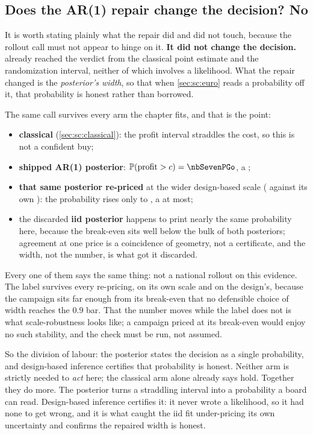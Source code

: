 \subsection*{Does the AR(1) repair change the decision? No}

It is worth stating plainly what the repair did and did not touch, because the rollout call must not
appear to hinge on it. \textbf{It did not change the decision.}  already
reached the verdict from the classical point estimate and the randomization interval, neither of which
involves a likelihood. What the repair changed is the \emph{posterior's width}, so that when
\cref{sec:sc:euro} reads a probability off it, that probability is honest rather than borrowed.

The same call survives every arm the chapter fits, and that is the point:
\begin{itemize}[leftmargin=*, itemsep=.2em]
  \item \textbf{classical} (\cref{sec:sc:classical}): the profit interval straddles the cost, so this
        is not a confident buy;
  \item \textbf{shipped AR(1) posterior}: $\Prob(\text{profit} > c) = \nbSevenPGo$, a
        \textbf{\nbSevenDecision};
  \item \textbf{that same posterior re-priced} at the wider design-based scale (\keur{\nbSevenPlaceboSd}
        against its own \keur{\nbSevenBayesSd}): the probability rises only to \nbSevenPGoRescaled{}, a
        \textbf{\nbSevenDecisionRescaled} at most;
  \item the discarded \textbf{iid posterior} happens to print nearly the same probability here,
        because the break-even sits well below the bulk of both posteriors; agreement at one price is a
        coincidence of geometry, not a certificate, and the width, not the number, is what got it
        discarded.
\end{itemize}
Every one of them says the same thing: not a national rollout on this evidence. The label survives
every re-pricing, \nbSevenDecision{} on its own scale and \nbSevenDecisionRescaled{} on the design's,
because the campaign sits far enough from its break-even that no defensible choice of width reaches
the $0.9$ bar. That the number moves while the label does not is what scale-robustness looks like; a
campaign priced at its break-even would enjoy no such stability, and the check must be run, not
assumed.

So the division of labour: the posterior states the decision as a single
probability, and design-based inference certifies that probability is honest. Neither arm is
strictly needed to \emph{act} here; the classical arm alone already says hold. Together they do
more. The posterior turns a straddling interval into a probability a board can read. Design-based
inference certifies it: it never wrote a likelihood, so it had none to get wrong, and it is what
caught the iid fit under-pricing its own uncertainty and confirms the repaired width is honest.

